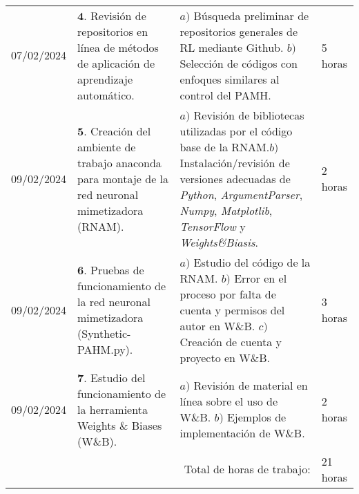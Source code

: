 \documentclass[12pt]{article}
\begin{document}
\hfill\\
\begin{minipage}[h]{\textwidth}
	\centering
	\begin{tabularx}{\textwidth}{|p{2cm}|X|X|p{2cm}|} 
		\hline		
		
	 	07/02/2024 & 
	 	$\mathbf{4}.$ Revisión de repositorios en línea de métodos de aplicación de aprendizaje automático. & 
	 	$a)$ Búsqueda preliminar de repositorios generales de RL mediante Github. \newline $b)$ Selección de códigos con enfoques similares al control del PAMH. \newline & 
	 	5 horas \\
	 	09/02/2024 & 
	 	$\mathbf{5}.$ Creación del ambiente de trabajo anaconda para montaje de la red neuronal mimetizadora (RNAM). & 
	 	$a)$ Revisión de bibliotecas utilizadas por el código base de la RNAM.\newline $b)$ Instalación/revisión de versiones adecuadas de \textit{Python}, \textit{ArgumentParser}, \textit{Numpy}, \textit{Matplotlib}, \textit{TensorFlow} y \textit{Weights\&Biasis}.\newline & 
	 	2 horas \\
	 	09/02/2024 & 
	 	$\mathbf{6}.$ Pruebas de funcionamiento de la red neuronal mimetizadora (Synthetic-PAHM.py). & 
	 	$a)$ Estudio del código de la RNAM. \newline $b)$ Error en el proceso por falta de cuenta y permisos del autor en W\&B. \newline $c)$ Creación de cuenta y proyecto en W\&B. \newline & 
	 	3 horas \\
	 	09/02/2024 & 
	 	$\mathbf{7}.$ Estudio del funcionamiento de la herramienta Weights \& Biases (W\&B). & 
	 	$a)$ Revisión de material en línea sobre el uso de W\&B. \newline $b)$ Ejemplos de implementación de W\&B. & 
	 	2 horas \\
	 	\hline
		\multicolumn{3}{|r|}{Total de horas de trabajo:} & 21 horas \\ 
	 	\hline                 
	\end{tabularx}
\end{minipage}
\end{document}
